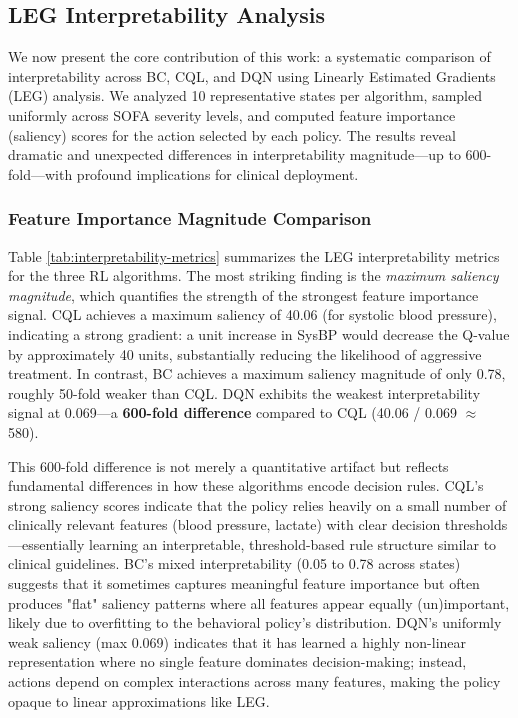 \subsection{LEG Interpretability Analysis}\label{sec:results:leg}

We now present the core contribution of this work: a systematic comparison of interpretability across BC, CQL, and DQN using Linearly Estimated Gradients (LEG) analysis. We analyzed 10 representative states per algorithm, sampled uniformly across SOFA severity levels, and computed feature importance (saliency) scores for the action selected by each policy. The results reveal dramatic and unexpected differences in interpretability magnitude—up to 600-fold—with profound implications for clinical deployment.

\subsubsection{Feature Importance Magnitude Comparison}

Table \ref{tab:interpretability-metrics} summarizes the LEG interpretability metrics for the three RL algorithms. The most striking finding is the \textit{maximum saliency magnitude}, which quantifies the strength of the strongest feature importance signal. CQL achieves a maximum saliency of 40.06 (for systolic blood pressure), indicating a strong gradient: a unit increase in SysBP would decrease the Q-value by approximately 40 units, substantially reducing the likelihood of aggressive treatment. In contrast, BC achieves a maximum saliency magnitude of only 0.78, roughly 50-fold weaker than CQL. DQN exhibits the weakest interpretability signal at 0.069—a \textbf{600-fold difference} compared to CQL (40.06 / 0.069 $\approx$ 580).

This 600-fold difference is not merely a quantitative artifact but reflects fundamental differences in how these algorithms encode decision rules. CQL's strong saliency scores indicate that the policy relies heavily on a small number of clinically relevant features (blood pressure, lactate) with clear decision thresholds—essentially learning an interpretable, threshold-based rule structure similar to clinical guidelines. BC's mixed interpretability (0.05 to 0.78 across states) suggests that it sometimes captures meaningful feature importance but often produces "flat" saliency patterns where all features appear equally (un)important, likely due to overfitting to the behavioral policy's distribution. DQN's uniformly weak saliency (max 0.069) indicates that it has learned a highly non-linear representation where no single feature dominates decision-making; instead, actions depend on complex interactions across many features, making the policy opaque to linear approximations like LEG.

